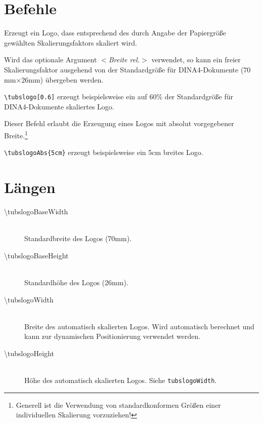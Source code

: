 \clearpage
\section{Befehle}

\begin{description}\label{cmd:tubslogo}
  \item[\color{tuRed}\mdseries\ttfamily \textbackslash tubslogo%
    {[\textcolor{tuGreenDark}{\sffamily\itshape $<$Breite rel.$>$}]}]
    Erzeugt ein Logo, dass entsprechend des durch Angabe der Papiergröße
    gewählten Skalierungsfaktors skaliert wird.

    Wird das optionale Argument {\sffamily\itshape $<$Breite rel.$>$}
    verwendet, so kann ein freier Skalierungsfaktor ausgehend von der
    Standardgröße für DINA4-Dokumente ($70$mm$\times 26$mm) übergeben werden.

    \lstinline!\tubslogo[0.6]! erzeugt beispielsweise ein auf 60\% der 
    Standardgröße für DINA4-Dokumente skaliertes Logo.

  \item[\color{tuRed}\mdseries\ttfamily \textbackslash tubslogoAbs%
    \{\textcolor{tuGreenDark}{Breite abs.}\}]
    Dieser Befehl erlaubt die Erzeugung eines Logos mit absolut vorgegebener
    Breite.\footnote{Generell ist die Verwendung von standardkonformen Größen
    einer individuellen Skalierung vorzuziehen!}

    \lstinline!\tubslogoAbs{5cm}! erzeugt beispielsweise ein 5cm breites Logo.
\end{description}


\section{Längen}
  \begin{description}
    \item[\mdseries\ttfamily \textbackslash tubslogoBaseWidth]\hfill\\
      Standardbreite des Logos (70mm).
    \item[\mdseries\ttfamily \textbackslash tubslogoBaseHeight]\hfill\\
      Standardhöhe des Logos (26mm).
    \item[\mdseries\ttfamily \textbackslash tubslogoWidth]\hfill\\
      Breite des automatisch skalierten Logos. Wird automatisch berechnet und
      kann zur dynamischen Positionierung verwendet werden.
    \item[\mdseries\ttfamily \textbackslash tubslogoHeight]\hfill\\
      Höhe des automatisch skalierten Logos. Siehe \lstinline{tubslogoWidth}.
  \end{description}
